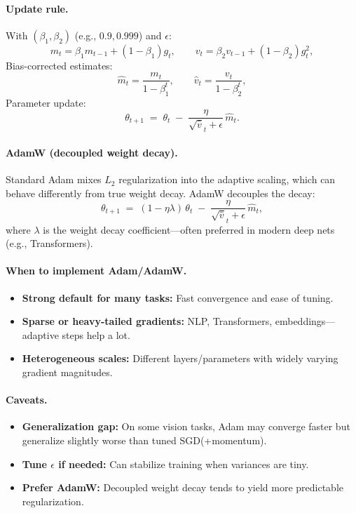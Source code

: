 \documentclass[12pt,a4paper]{report}
\begin{document}
\paragraph{Update rule.}
With $(\beta_1,\beta_2)$ (e.g., $0.9, 0.999$) and $\epsilon$:
\[
m_t = \beta_1 m_{t-1} + (1-\beta_1) g_t, \qquad
v_t = \beta_2 v_{t-1} + (1-\beta_2) g_t^2,
\]
Bias-corrected estimates:
\[
\hat{m}_t = \frac{m_t}{1-\beta_1^t}, \qquad
\hat{v}_t = \frac{v_t}{1-\beta_2^t},
\]
Parameter update:
\[
\theta_{t+1} \;=\; \theta_t \;-\; \frac{\eta}{\sqrt{\hat{v}}_t + \epsilon}\, \hat{m}_t.
\]

\paragraph{AdamW (decoupled weight decay).}
Standard Adam mixes $L_2$ regularization into the adaptive scaling, which can behave differently from true weight decay. 
AdamW decouples the decay:
\[
\theta_{t+1} \;=\; (1 - \eta\lambda)\,\theta_t \;-\; \frac{\eta}{\sqrt{\hat{v}}_t + \epsilon}\, \hat{m}_t,
\]
where $\lambda$ is the weight decay coefficient—often preferred in modern deep nets (e.g., Transformers).

\paragraph{When to implement Adam/AdamW.}
\begin{itemize}
    \item \textbf{Strong default for many tasks:} Fast convergence and ease of tuning.
    \item \textbf{Sparse or heavy-tailed gradients:} NLP, Transformers, embeddings—adaptive steps help a lot.
    \item \textbf{Heterogeneous scales:} Different layers/parameters with widely varying gradient magnitudes.
\end{itemize}

\paragraph{Caveats.}
\begin{itemize}
    \item \textbf{Generalization gap:} On some vision tasks, Adam may converge faster but generalize slightly worse than tuned SGD(+momentum).
    \item \textbf{Tune $\epsilon$ if needed:} Can stabilize training when variances are tiny.
    \item \textbf{Prefer AdamW:} Decoupled weight decay tends to yield more predictable regularization.
\end{itemize}
\end{document}
